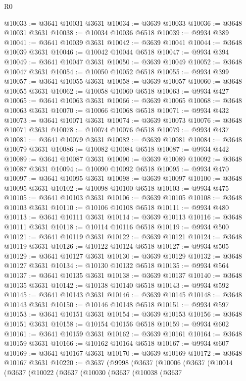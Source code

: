 \begin{lexlean}{R0}
\begin{coremodule}
@10033 := @3641 @10031 @3631
@10034 := @3639 @10033
@10036 := @3648 @10031 @3631
@10038 := @10034 @10036 @6518
@10039 := @9934 @389
@10041 := @3641 @10039 @3631
@10042 := @3639 @10041
@10044 := @3648 @10039 @3631
@10046 := @10042 @10044 @6518
@10047 := @9934 @394
@10049 := @3641 @10047 @3631
@10050 := @3639 @10049
@10052 := @3648 @10047 @3631
@10054 := @10050 @10052 @6518
@10055 := @9934 @399
@10057 := @3641 @10055 @3631
@10058 := @3639 @10057
@10060 := @3648 @10055 @3631
@10062 := @10058 @10060 @6518
@10063 := @9934 @427
@10065 := @3641 @10063 @3631
@10066 := @3639 @10065
@10068 := @3648 @10063 @3631
@10070 := @10066 @10068 @6518
@10071 := @9934 @432
@10073 := @3641 @10071 @3631
@10074 := @3639 @10073
@10076 := @3648 @10071 @3631
@10078 := @10074 @10076 @6518
@10079 := @9934 @437
@10081 := @3641 @10079 @3631
@10082 := @3639 @10081
@10084 := @3648 @10079 @3631
@10086 := @10082 @10084 @6518
@10087 := @9934 @442
@10089 := @3641 @10087 @3631
@10090 := @3639 @10089
@10092 := @3648 @10087 @3631
@10094 := @10090 @10092 @6518
@10095 := @9934 @470
@10097 := @3641 @10095 @3631
@10098 := @3639 @10097
@10100 := @3648 @10095 @3631
@10102 := @10098 @10100 @6518
@10103 := @9934 @475
@10105 := @3641 @10103 @3631
@10106 := @3639 @10105
@10108 := @3648 @10103 @3631
@10110 := @10106 @10108 @6518
@10111 := @9934 @480
@10113 := @3641 @10111 @3631
@10114 := @3639 @10113
@10116 := @3648 @10111 @3631
@10118 := @10114 @10116 @6518
@10119 := @9934 @500
@10121 := @3641 @10119 @3631
@10122 := @3639 @10121
@10124 := @3648 @10119 @3631
@10126 := @10122 @10124 @6518
@10127 := @9934 @505
@10129 := @3641 @10127 @3631
@10130 := @3639 @10129
@10132 := @3648 @10127 @3631
@10134 := @10130 @10132 @6518
@10135 := @9934 @564
@10137 := @3641 @10135 @3631
@10138 := @3639 @10137
@10140 := @3648 @10135 @3631
@10142 := @10138 @10140 @6518
@10143 := @9934 @592
@10145 := @3641 @10143 @3631
@10146 := @3639 @10145
@10148 := @3648 @10143 @3631
@10150 := @10146 @10148 @6518
@10151 := @9934 @597
@10153 := @3641 @10151 @3631
@10154 := @3639 @10153
@10156 := @3648 @10151 @3631
@10158 := @10154 @10156 @6518
@10159 := @9934 @602
@10161 := @3641 @10159 @3631
@10162 := @3639 @10161
@10164 := @3648 @10159 @3631
@10166 := @10162 @10164 @6518
@10167 := @9934 @607
@10169 := @3641 @10167 @3631
@10170 := @3639 @10169
@10172 := @3648 @10167 @3631
@10220 := @3637
    (@9998
      (@3637
        (@10006
          (@3637
            (@10014
              (@3637
                (@10022
                  (@3637
                    (@10030
                      (@3637
                        (@10038
                          (@3637

\end{coremodule}
\end{lexlean}
